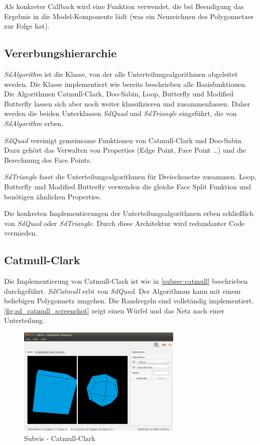 Als konkreter Callback wird eine Funktion verwendet, die bei Beendigung das Ergebnis in die Model-Komponente lädt (was ein Neuzeichnen des Polygonnetzes zur Folge hat).

\subsection{Vererbungshierarchie}

\emph{SdAlgorithm} ist die Klasse, von der alle Unterteilungsalgorithmen abgeleitet werden.
Die Klasse implementiert wie bereits beschrieben alle Basisfunktionen.
Die Algorithmen Catmull-Clark, Doo-Sabin, Loop, Butterfly und Modified Butterfly lassen sich aber
noch weiter klassifizieren und zusammenfassen.
Daher werden die beiden Unterklassen \emph{SdQuad} und \emph{SdTriangle} eingeführt,
die von \emph{SdAlgorithm} erben.

\emph{SdQuad} vereinigt gemeinsame Funktionen von Catmull-Clark und Doo-Sabin.
Dazu gehört das Verwalten von Properties (Edge Point, Face Point \ldots) und
die Berechnung des Face Points.

\emph{SdTriangle} fasst die Unterteilungsalgorithmen für Dreiecksnetze zusammen.
Loop, Butterfly und Modified Butterfly verwenden die gleiche Face Split Funktion
und benötigen ähnlichen Properties.

Die konkreten Implementierungen der Unterteilungsalgorithmen erben schließlich
von \emph{SdQuad} oder \emph{SdTriangle}.
Durch diese Architektur wird redundanter Code vermieden.


\subsection{Catmull-Clark}

Die Implementierung von Catmull-Clark ist wie in \autoref{subsec:catmull}
beschrieben durchgeführt. \emph{SdCatmull} erbt von \emph{SdQuad}.
Der Algorithmus kann mit einem beliebigen Polygonnetz umgehen.
Die Randregeln sind vollständig implementiert.
\autoref{fig:sd_catmull_screenshot} zeigt einen Würfel und das Netz nach
einer Unterteilung.

\begin{figure}
  \centering
  \includegraphics[width=0.7\textwidth]{content/media/sd_catmull_screenshot.png}
  \caption{Subvis - Catmull-Clark}
  \label{fig:sd_catmull_screenshot}
\end{figure}


